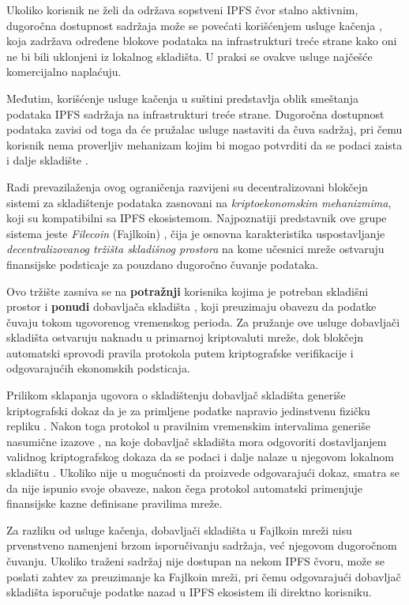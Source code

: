 Ukoliko korisnik ne želi da održava sopstveni IPFS čvor stalno aktivnim, dugoročna dostupnost sadržaja može se povećati korišćenjem usluge kačenja , koja zadržava određene blokove podataka na infrastrukturi treće strane kako oni ne bi bili uklonjeni iz lokalnog skladišta. U praksi se ovakve usluge najčešće komercijalno naplaćuju.

Međutim, korišćenje usluge kačenja u suštini predstavlja oblik smeštanja podataka  IPFS sadržaja na infrastrukturi treće strane. Dugoročna dostupnost podataka zavisi od toga da će pružalac usluge nastaviti da čuva sadržaj, pri čemu korisnik nema proverljiv mehanizam kojim bi mogao potvrditi da se podaci zaista i dalje skladište \cite{lamichhane2024verifiable}.

Radi prevazilaženja ovog ograničenja razvijeni su decentralizovani blokčejn sistemi za skladištenje podataka zasnovani na \textit{kriptoekonomskim mehanizmima}, koji su kompatibilni sa IPFS ekosistemom. Najpoznatiji predstavnik ove grupe sistema jeste \textit{Filecoin} (Fajlkoin) \cite{benet2018filecoin}, čija je osnovna karakteristika uspostavljanje \textit{decentralizovanog tržišta skladišnog prostora} na kome učesnici mreže ostvaruju finansijske podsticaje za pouzdano dugoročno čuvanje podataka.

Ovo tržište zasniva se na \textbf{potražnji} korisnika kojima je potreban skladišni prostor i \textbf{ponudi} dobavljača skladišta , koji preuzimaju obavezu da podatke čuvaju tokom ugovorenog vremenskog perioda. Za pružanje ove usluge dobavljači skladišta ostvaruju naknadu u primarnoj kriptovaluti mreže, dok blokčejn automatski sprovodi pravila protokola putem kriptografske verifikacije i odgovarajućih ekonomskih podsticaja.

Prilikom sklapanja ugovora o skladištenju dobavljač skladišta generiše kriptografski dokaz da je za primljene podatke napravio jedinstvenu fizičku repliku  \cite{fisch2018scaling}. Nakon toga protokol u pravilnim vremenskim intervalima generiše nasumične izazove , na koje dobavljač skladišta mora odgovoriti dostavljanjem validnog kriptografskog dokaza da se podaci i dalje nalaze u njegovom lokalnom skladištu  \cite{moran2019simple}. Ukoliko nije u mogućnosti da proizvede odgovarajući dokaz, smatra se da nije ispunio svoje obaveze, nakon čega protokol automatski primenjuje finansijske kazne definisane pravilima mreže.

Za razliku od usluge kačenja, dobavljači skladišta u Fajlkoin mreži nisu prvenstveno namenjeni brzom isporučivanju sadržaja, već njegovom dugoročnom čuvanju. Ukoliko traženi sadržaj nije dostupan na nekom IPFS čvoru, može se poslati zahtev za preuzimanje  ka Fajlkoin mreži, pri čemu odgovarajući dobavljač skladišta isporučuje podatke nazad u IPFS ekosistem ili direktno korisniku.

